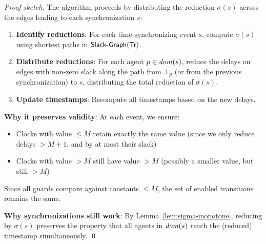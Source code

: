 \begin{proof}[Proof sketch]
The algorithm proceeds by distributing the reduction $\sigma(s)$ across the edges leading to each synchronization $s$:

\begin{enumerate}
\item \textbf{Identify reductions}: For each time-synchronizing event $s$, compute $\sigma(s)$ using shortest paths in $\mathrm{\textsf{Slack-Graph}}(\textsf{Tr})$.

\item \textbf{Distribute reductions}: For each agent $p \in \mathit{dom}(s)$, reduce the delays on edges with non-zero slack along the path from $\bot_p$ (or from the previous synchronization) to $s$, distributing the total reduction of $\sigma(s)$.

\item \textbf{Update timestamps}: Recompute all timestamps based on the new delays.
\end{enumerate}

\textbf{Why it preserves validity}: At each event, we ensure:
\begin{itemize}
\item Clocks with value $\leq M$ retain exactly the same value (since we only reduce delays $> M+1$, and by at most their slack)
\item Clocks with value $> M$ still have value $> M$ (possibly a smaller value, but still $> M$)
\end{itemize}

Since all guards compare against constants $\leq M$, the set of enabled transitions remains the same.

\textbf{Why synchronizations still work}: By Lemma~\ref{lem:sigma-monotone}, reducing by $\sigma(s)$ preserves the property that all agents in $\mathit{dom}(s)$ reach the (reduced) timestamp simultaneously. \qed
\end{proof}

